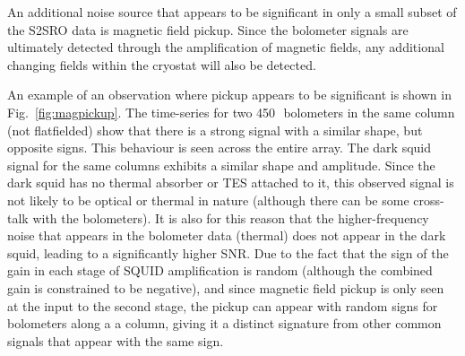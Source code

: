 \documentclass[useAMS,usenatbib,nofootinbib]{mn2e}
\newcommand{\snr}{SNR}
\begin{document}
An additional noise source that appears to be significant in only a
small subset of the S2SRO data is magnetic field pickup. Since the
bolometer signals are ultimately detected through the amplification of
magnetic fields, any additional changing fields within the cryostat
will also be detected.

An example of an observation where pickup appears to be significant is
shown in Fig.~\ref{fig:magpickup}. The time-series for two
450\,\micron\ bolometers in the same column (not flatfielded) show
that there is a strong signal with a similar shape, but opposite
signs. This behaviour is seen across the entire array. The dark squid
signal for the same columns exhibits a similar shape and
amplitude. Since the dark squid has no thermal absorber or TES
attached to it, this observed signal is not likely to be optical or
thermal in nature (although there can be some cross-talk with the
bolometers). It is also for this reason that the higher-frequency
noise that appears in the bolometer data (thermal) does not appear in
the dark squid, leading to a significantly higher \snr. Due to the
fact that the sign of the gain in each stage of SQUID amplification is
random (although the combined gain is constrained to be negative), and
since magnetic field pickup is only seen at the input to the second
stage, the pickup can appear with random signs for bolometers along a
a column, giving it a distinct signature from other common signals
that appear with the same sign.
\end{document}
